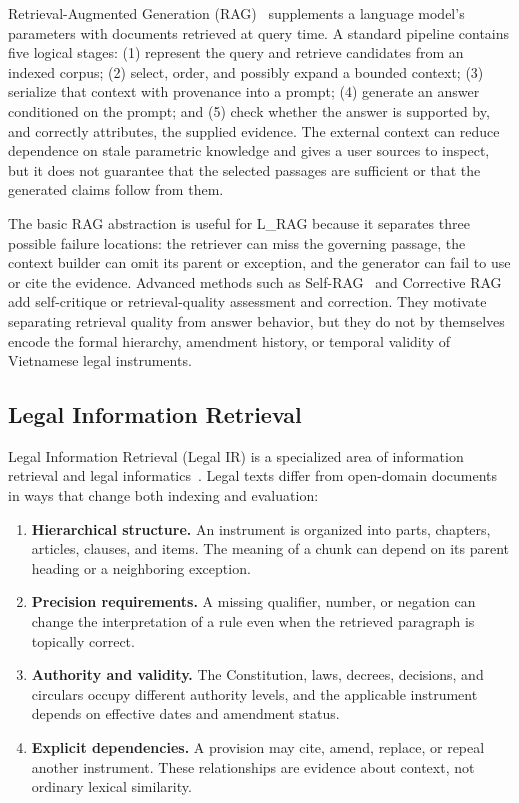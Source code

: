Retrieval-Augmented Generation (RAG)~\cite{lewis2020retrieval} supplements a
language model's parameters with documents retrieved at query time. A
standard pipeline contains five logical stages: (1) represent the query and
retrieve candidates from an indexed corpus; (2) select, order, and possibly
expand a bounded context; (3) serialize that context with provenance into a
prompt; (4) generate an answer conditioned on the prompt; and (5) check
whether the answer is supported by, and correctly attributes, the supplied
evidence. The external context can reduce dependence on stale parametric
knowledge and gives a user sources to inspect, but it does not guarantee that
the selected passages are sufficient or that the generated claims follow from
them.

The basic RAG abstraction is useful for L\_RAG because it separates three
possible failure locations: the retriever can miss the governing passage, the
context builder can omit its parent or exception, and the generator can fail
to use or cite the evidence. Advanced methods such as
Self-RAG~\cite{asai2023self} and Corrective RAG~\cite{yan2024corrective} add
self-critique or retrieval-quality assessment and correction. They motivate
separating retrieval quality from answer behavior, but they do not by
themselves encode the formal hierarchy, amendment history, or temporal
validity of Vietnamese legal instruments.

\subsection{Legal Information Retrieval}
\label{sec:related-legal-ir}

Legal Information Retrieval (Legal IR) is a specialized area of information
retrieval and legal informatics~\cite{locke2022legal}. Legal texts differ from
open-domain documents in ways that change both indexing and evaluation:

\begin{enumerate}
    \item \textbf{Hierarchical structure.} An instrument is organized into
    parts, chapters, articles, clauses, and items. The meaning of a chunk can
    depend on its parent heading or a neighboring exception.
    \item \textbf{Precision requirements.} A missing qualifier, number, or
    negation can change the interpretation of a rule even when the retrieved
    paragraph is topically correct.
    \item \textbf{Authority and validity.} The Constitution, laws, decrees,
    decisions, and circulars occupy different authority levels, and the
    applicable instrument depends on effective dates and amendment status.
    \item \textbf{Explicit dependencies.} A provision may cite, amend,
    replace, or repeal another instrument. These relationships are evidence
    about context, not ordinary lexical similarity.
\end{enumerate}

